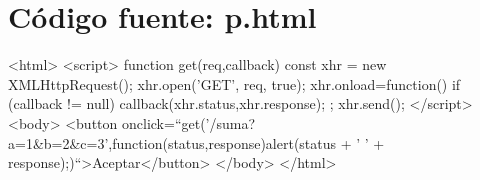 \chapter{Código fuente: p.html}
\begin{SourceCode}
<html>
  <script>
    function get(req,callback)
    {
      const xhr = new XMLHttpRequest();
      xhr.open('GET', req, true);
      xhr.onload=function()
      {
        if (callback != null) callback(xhr.status,xhr.response);
      };
      xhr.send();
    }
  </script>
  <body>
    <button onclick=``get('/suma?a=1&b=2&c=3',function(status,response){alert(status + ' ' + response);})``>Aceptar</button>
  </body>
</html>
\end{SourceCode}
